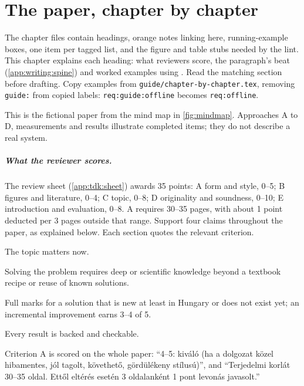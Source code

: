 \chapter{The paper, chapter by chapter}\label{app:chapters}
The chapter files contain headings, orange notes linking here, running-example boxes, one item per tagged list, and the figure and table stubs needed by the lint. This chapter explains each heading: what reviewers score, the paragraph's beat (\cref{app:writing:spine}) and worked examples using \exname. Read the matching section before drafting. Copy examples from \texttt{guide/chapter-by-chapter.tex}, removing \texttt{guide:} from copied labels: \texttt{req:guide:offline} becomes \texttt{req:offline}.

This is the fictional paper from the mind map in \cref{fig:mindmap}. Approaches A to D, measurements and results illustrate completed items; they do not describe a real system.

\paragraph{What the reviewer scores.} The review sheet (\cref{app:tdk:sheet}) awards 35 points: A form and style, 0--5; B figures and literature, 0--4; C topic, 0--8; D originality and soundness, 0--10; E introduction and evaluation, 0--8. A requires 30--35 pages, with about 1 point deducted per 3 pages outside that range. Support four claims throughout the paper, as explained below. Each section quotes the relevant criterion.
\begin{description}[noitemsep]
  \item[Relevance (C)] The topic matters now.
  \item[Non-triviality (C and D/1)] Solving the problem requires deep or scientific knowledge beyond a textbook recipe or reuse of known solutions.
  \item[Novelty (D/1)] Full marks for a solution that is new at least in Hungary or does not exist yet; an incremental improvement earns 3--4 of 5.
  \item[Correctness (D/2)] Every result is backed and checkable.
\end{description}
Criterion A is scored on the whole paper: \enquote{4--5: kiváló (ha a dolgozat közel hibamentes, jól tagolt, követhető, gördülékeny stílusú)}, and \enquote{Terjedelmi korlát 30--35 oldal. Ettől eltérés esetén 3 oldalanként 1 pont levonás javasolt.}

